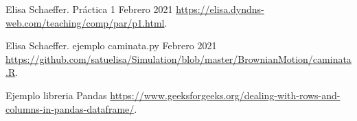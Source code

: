 \documentclass{article}
\begin{document}
\begin{thebibliography}{99} %

 Elisa Schaeffer. Práctica 1 Febrero 2021
\url{https://elisa.dyndns-web.com/teaching/comp/par/p1.html}.

 Elisa Schaeffer. ejemplo caminata.py Febrero 2021
\url{https://github.com/satuelisa/Simulation/blob/master/BrownianMotion/caminata.R}.

 Ejemplo libreria Pandas
\url{https://www.geeksforgeeks.org/dealing-with-rows-and-columns-in-pandas-dataframe/}.

\end{thebibliography}
\end{document}

